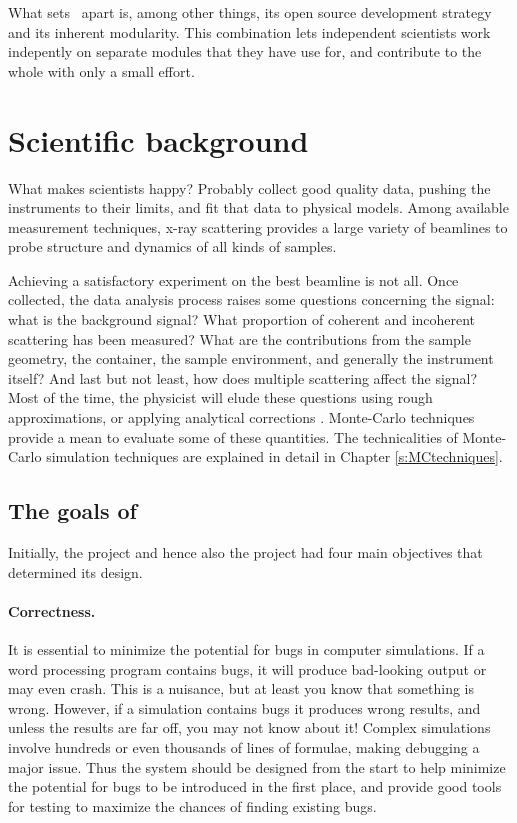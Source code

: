 What sets \MCX\ apart is, among other things, its open source
development strategy and its inherent modularity. 
This combination lets independent scientists work indepently on separate
modules that they have use for, and contribute to the whole with only a small
effort.

\section{Scientific background}
What makes scientists happy? Probably collect good quality data, pushing the instruments to their limits, and fit that data to physical models.
Among available measurement techniques, x-ray scattering provides a
large variety of beamlines to probe structure and dynamics of all
kinds of samples.

Achieving a satisfactory experiment on the best beamline is not all. Once collected, the data analysis process
raises some questions concerning the signal: what is the background
signal? What proportion of coherent and incoherent scattering has
been measured? What are the contributions from the sample geometry, the
container, the sample environment, and generally the instrument
itself? And last but not least, how does multiple scattering affect the
signal? Most of the time, the physicist will elude these questions
using rough approximations, or applying analytical corrections
\cite{Copley86}. Monte-Carlo techniques provide a mean to evaluate
some of these quantities. The technicalities of Monte-Carlo simulation
techniques are explained in detail in Chapter \ref{s:MCtechniques}.


\subsection{The goals of \MCX}
\label{s:goals}

Initially, the \MCS project and hence also the \MCX project had four main objectives
that determined its design.

\paragraph{Correctness.}
It is essential to minimize the potential for bugs in computer
simulations.  If a word processing program contains bugs, it will
produce bad-looking output or may even crash. This is a nuisance, but at
least you know that something is wrong. However, if a simulation
contains bugs it produces wrong results, and unless the results are far
off, you may not know about it! Complex simulations involve hundreds or
even thousands of lines of formulae, making debugging a major issue. Thus the
system should be designed from the start to help minimize the potential
for bugs to be introduced in the first place, and provide good tools for
testing to maximize the chances of finding existing bugs.
%
